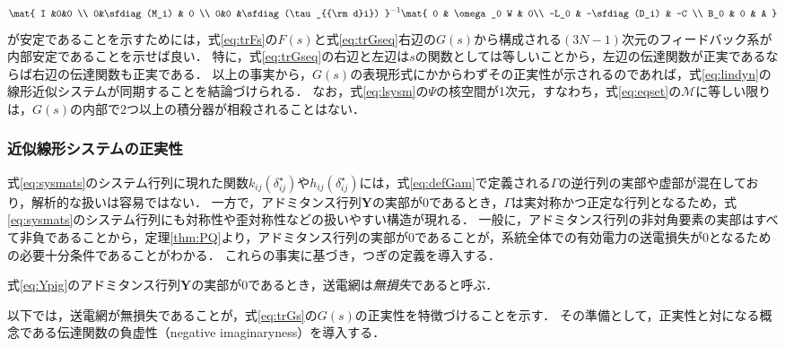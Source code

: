 \documentclass[a4j,10pt,oneside,openany,dvipdfmx]{jsbook}
\begin{document}
\[
\mat{
I &0&0 \\
0&\sfdiag(M_i) & 0 \\
0&0 &\sfdiag(\tau_{{\rm d}i}) 
}^{-1}
\mat{
 0 & \omega_0 W & 0\\
  -L_0 & -\sfdiag(D_i) & -C \\
 B_0 & 0 & A
 }
\]
が安定であることを示すためには，式\eqref{eq:trFs}の$F(s)$と式\eqref{eq:trGseq}右辺の$G(s)$から構成される$(3N-1)$次元のフィードバック系が内部安定であることを示せば良い．
特に，式\eqref{eq:trGseq}の右辺と左辺は$s$の関数としては等しいことから，左辺の伝達関数が正実であるならば右辺の伝達関数も正実である．
以上の事実から，$G(s)$の表現形式にかからわずその正実性が示されるのであれば，式\eqref{eq:lindyn}の線形近似システムが同期することを結論づけられる．
なお，式\eqref{eq:lsysm}の$\Psi$の核空間が1次元，すなわち，式\eqref{eq:eqset}の$\mathcal{M}$に等しい限りは，$G(s)$の内部で2つ以上の積分器が相殺されることはない．

\subsubsection{近似線形システムの正実性}

式\eqref{eq:sysmats}のシステム行列に現れた関数$k_{ij}(\delta_{ij}^{\star})$や$h_{ij}(\delta_{ij}^{\star})$には，式\eqref{eq:defGam}で定義される$\bm{\mathit{\Gamma}}$の逆行列の実部や虚部が混在しており，解析的な扱いは容易ではない．
一方で，アドミタンス行列$\bm{Y}$の実部が0であるとき，$\bm{\mathit{\Gamma}}$は実対称かつ正定な行列となるため，式\eqref{eq:sysmats}のシステム行列にも対称性や歪対称性などの扱いやすい構造が現れる．
一般に，アドミタンス行列の非対角要素の実部はすべて非負であることから，定理\ref{thm:PQ}より，アドミタンス行列の実部が0であることが，系統全体での有効電力の送電損失が0となるための必要十分条件であることがわかる．
これらの事実に基づき，つぎの定義を導入する．

\begin{definition}\label{def:lless}
式\eqref{eq:Ypig}のアドミタンス行列$\bm{Y}$の実部が0であるとき，送電網は\emph{無損失}であると呼ぶ．
\end{definition}

以下では，送電網が無損失であることが，式\eqref{eq:trGs}の$G(s)$の正実性を特徴づけることを示す．
その準備として，正実性と対になる概念である伝達関数の負虚性（negative imaginaryness）を導入する\cite{petersen2010feedback,xiong2010negative}．
\end{document}
